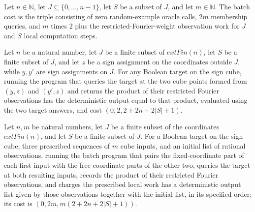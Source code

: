 \begin{definition}
\label{FABL.restrictedFourierWeightObservationBatchCost}
\leanok
{}
Let $n\in\mathbb N$, let $J\subseteq\{0,\ldots,n-1\}$, let $S$ be a subset of $J$, and
let $m\in\mathbb N$. The batch cost is the triple consisting of zero random-example
oracle calls, $2m$ membership queries, and $m$ times $2$ plus the
restricted-Fourier-weight observation work for $J$ and $S$ local computation steps.
\end{definition}

\begin{theorem}
\label{FABL.runWithCost_restrictedFourierWeightObservationProgram}
\leanok
{}
Let $n$ be a natural number, let $J$ be a finite subset of $	ext{Fin}(n)$, let $S$ be a
finite subset of $J$, and let $z$ be a sign assignment on the coordinates outside $J$,
while $y,y'$ are sign assignments on $J$. For any Boolean target on the sign cube,
running the program that queries the target at the two cube points formed from $(y,z)$
and $(y',z)$ and returns the product of their restricted Fourier observations has the
deterministic output equal to that product, evaluated using the two target answers, and
cost $(0,2,2+2n+2|S|+1)$.
\end{theorem}

\begin{theorem}
\label{FABL.runWithCost_restrictedFourierWeightObservationBatchProgramWith_pure}
\leanok
{}
Let $n,m$ be natural numbers, let $J$ be a finite subset of the coordinates
$	ext{Fin}(n)$, and let $S$ be a finite subset of $J$. For a Boolean target on the sign
cube, three prescribed sequences of $m$ cube inputs, and an initial list of rational
observations, running the batch program that pairs the fixed-coordinate part of each
first input with the free-coordinate parts of the other two, queries the target at both
resulting inputs, records the product of their restricted Fourier observations, and
charges the prescribed local work has a deterministic output list given by those
observations together with the initial list, in its specified order; its cost is
$(0,2m,m(2+2n+2|S|+1))$.
\end{theorem}

